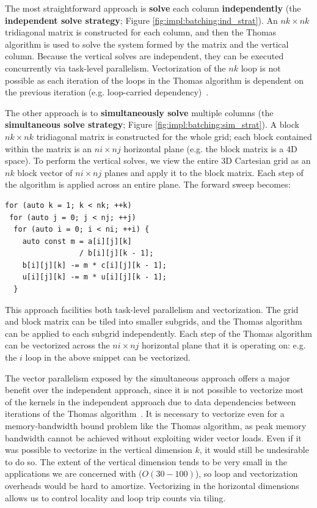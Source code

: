\documentclass[10pt, conference, compsocconf]{IEEEtran}
\begin{document}
The most straightforward approach is \textbf{solve} each column
  \textbf{independently} (the \textbf{independent solve strategy}; Figure
  \ref{fig:impl:batching:ind_strat}).
An \(nk \times nk\) tridiagonal matrix is constructed for each column, and then
  the Thomas algorithm is used to solve the system formed by the matrix and the
  vertical column.
Because the vertical solves are independent, they can be executed concurrently
  via task-level parallelism.
Vectorization of the \(nk\) loop is not possible as each iteration of the loops
  in the Thomas algorithm is dependent on the previous iteration (e.g.
  loop-carried dependency)~\cite{pipelined_thomas_algorithm}.

The other approach is to \textbf{simultaneously solve} multiple columns (the
  \textbf{simultaneous solve strategy}; Figure
  \ref{fig:impl:batching:sim_strat}).
A block \(nk \times nk\) tridiagonal matrix is constructed for the whole grid;
  each block contained within the matrix is an \(ni \times nj\) horizontal plane
  (e.g. the block matrix is a 4D space).
To perform the vertical solves, we view the entire 3D Cartesian grid as an
  \(nk\) block vector of \(ni \times nj\) planes and apply it to the block
  matrix.
Each step of the algorithm is applied across an entire plane.
The forward sweep becomes:
\begin{lstlisting}
for (auto k = 1; k < nk; ++k)
 for (auto j = 0; j < nj; ++j)
  for (auto i = 0; i < ni; ++i) {
    auto const m = a[i][j][k]
                 / b[i][j][k - 1];
    b[i][j][k] -= m * c[i][j][k - 1];
    u[i][j][k] -= m * u[i][j][k - 1];
  } 
\end{lstlisting}
This approach facilities both task-level parallelism and vectorization.
The grid and block matrix can be tiled into smaller subgrids, and the Thomas
  algorithm can be applied to each subgrid independently.
Each step of the Thomas algorithm can be vectorized across the \(ni \times nj\)
  horizontal plane that it is operating on: e.g. the \(i\) loop in the
  above snippet can be vectorized.

The vector parallelism exposed by the simultaneous approach offers a major
  benefit over the independent approach, since it is not possible to vectorize
  most of the kernels in the independent approach due to data dependencies
  between iterations of the Thomas algorithm~\cite{pipelined_thomas_algorithm}.
It is necessary to vectorize even for a memory-bandwidth bound problem like the
  Thomas algorithm, as peak memory bandwidth cannot be achieved without
  exploiting wider vector loads.
Even if it was possible to vectorize in the vertical dimension \(k\), it would
  still be undesirable to do so.
The extent of the vertical dimension tends to be very small in the applications
  we are concerned with (\(O(30-100)\)), so loop and vectorization overheads
  would be hard to amortize.
Vectorizing in the horizontal dimensions allows us to control locality and loop
  trip counts via tiling.
\end{document}
